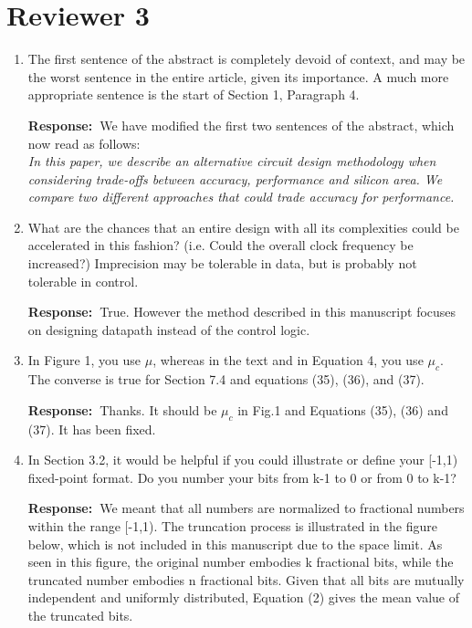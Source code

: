 \documentclass[a4paper, 11pt]{article}
\def\Response{\noindent \textbf{Response:~}}
\newcommand{\Question}[1]{\textcolor[rgb]{0.51,0.00,0.00}{#1}}
\newcommand{\PaperText}[1]{\emph{#1}}
\begin{document}
\section*{Reviewer 3}
\begin{enumerate}
  \item \Question{The first sentence of the abstract is completely devoid of context, and may be the worst sentence in the entire article, given its importance. A much more appropriate sentence is the start of Section 1, Paragraph 4.}
            
      \Response We have modified the first two sentences of the abstract, which now read as follows:\\
           
      \PaperText{In this paper, we describe an alternative circuit design methodology when considering trade-offs between accuracy, performance and silicon area. We compare two different approaches that could trade accuracy for performance.}\\

  \item \Question{What are the chances that an entire design with all its complexities could be accelerated in this fashion? (i.e. Could the overall clock frequency be increased?) Imprecision may be tolerable in data, but is probably not tolerable in control.}
            
      \Response True. However the method described in this manuscript focuses on designing datapath instead of the control logic.\\
      
  \item \Question{In Figure 1, you use $\mu$, whereas in the text and in Equation 4, you use $\mu_c$.  The converse is true for Section 7.4 and equations (35), (36), and (37).}
      
      \Response Thanks. It should be $\mu_c$ in Fig.1 and Equations (35), (36) and (37). It has been fixed.\\
      
  \item \Question{In Section 3.2, it would be helpful if you could illustrate or define your [-1,1) fixed-point format. Do you number your bits from k-1 to 0 or from 0 to k-1?}
      
      \Response We meant that all numbers are normalized to fractional numbers within the range [-1,1). The truncation process is illustrated in the figure below, which is not included in this manuscript due to the space limit. As seen in this figure, the original number embodies k fractional bits, while the truncated number embodies n fractional bits. Given that all bits are mutually independent and uniformly distributed, Equation (2) gives the mean value of the truncated bits. 
      

\end{enumerate}
\end{document}

